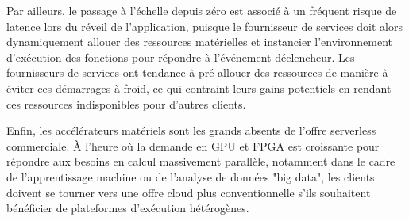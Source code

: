 Par ailleurs, le passage à l'échelle depuis zéro est associé à un fréquent risque de latence lors du réveil de l'application, puisque le fournisseur de services doit alors dynamiquement allouer des ressources matérielles et instancier l'environnement d'exécution des fonctions pour répondre à l'événement déclencheur. Les fournisseurs de services ont tendance à pré-allouer des ressources de manière à éviter ces démarrages à froid, ce qui contraint leurs gains potentiels en rendant ces ressources indisponibles pour d'autres clients.

Enfin, les accélérateurs matériels sont les grands absents de l'offre serverless commerciale. À l'heure où la demande en GPU et FPGA est croissante pour répondre aux besoins en calcul massivement parallèle, notamment dans le cadre de l'apprentissage machine ou de l'analyse de données "big data", les clients doivent se tourner vers une offre cloud plus conventionnelle s'ils souhaitent bénéficier de plateformes d'exécution hétérogènes.

